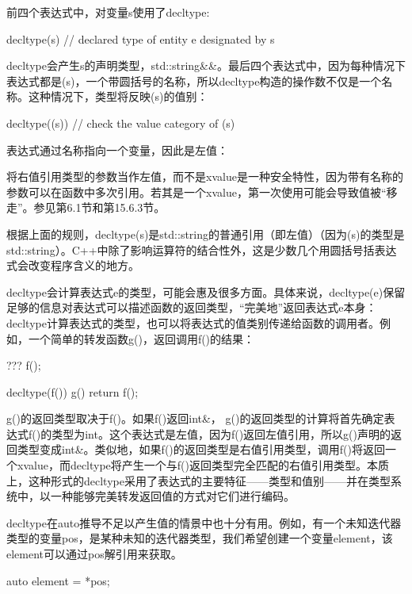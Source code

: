 前四个表达式中，对变量s使用了decltype:

\begin{cpp}
decltype(s) // declared type of entity e designated by s
\end{cpp}

decltype会产生s的声明类型，std::string\&\&。最后四个表达式中，因为每种情况下表达式都是(s)，一个带圆括号的名称，所以decltype构造的操作数不仅是一个名称。这种情况下，类型将反映(s)的值别：

\begin{cpp}
decltype((s)) // check the value category of (s)
\end{cpp}

表达式通过名称指向一个变量，因此是左值：

\begin{notice}
将右值引用类型的参数当作左值，而不是xvalue是一种安全特性，因为带有名称的参数可以在函数中多次引用。若其是一个xvalue，第一次使用可能会导致值被“移走”。参见第6.1节和第15.6.3节。
\end{notice}

根据上面的规则，decltype(s)是std::string的普通引用（即左值）（因为(s)的类型是std::string）。C++中除了影响运算符的结合性外，这是少数几个用圆括号括表达式会改变程序含义的地方。

decltype会计算表达式e的类型，可能会惠及很多方面。具体来说，decltype(e)保留足够的信息对表达式可以描述函数的返回类型，“完美地”返回表达式e本身：decltype计算表达式的类型，也可以将表达式的值类别传递给函数的调用者。例如，一个简单的转发函数g()，返回调用f()的结果：

\begin{cpp}
??? f();

decltype(f()) g() {
	return f();
}
\end{cpp}

g()的返回类型取决于f()。如果f()返回int\&， g()的返回类型的计算将首先确定表达式f()的类型为int。这个表达式是左值，因为f()返回左值引用，所以g()声明的返回类型变成int\&。类似地，如果f()的返回类型是右值引用类型，调用f()将返回一个xvalue，而decltype将产生一个与f()返回类型完全匹配的右值引用类型。本质上，这种形式的decltype采用了表达式的主要特征——类型和值别——并在类型系统中，以一种能够完美转发返回值的方式对它们进行编码。

decltype在auto推导不足以产生值的情景中也十分有用。例如，有一个未知迭代器类型的变量pos，是某种未知的迭代器类型，我们希望创建一个变量element，该element可以通过pos解引用来获取。

\begin{cpp}
auto element = *pos;
\end{cpp}

